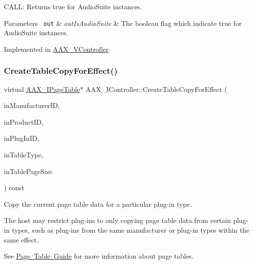 C\+A\+LL\+: Returns true for Audio\+Suite instances. 


\begin{DoxyParams}[1]{Parameters}
\mbox{\texttt{ out}}  & {\em out\+Is\+Audio\+Suite} & The boolean flag which indicate true for Audio\+Suite instances. \\
\hline
\end{DoxyParams}


Implemented in \mbox{\hyperlink{a01905_a3d3bd957f2b2f863333deadf5b8e6c6c}{A\+A\+X\+\_\+\+V\+Controller}}.

\mbox{\label{a01789_acd6c896d35ee2c36e8f6685f0c8592ad}} 
\subsubsection{\texorpdfstring{CreateTableCopyForEffect()}{CreateTableCopyForEffect()}}
{\footnotesize\ttfamily virtual \mbox{\hyperlink{a01849}{A\+A\+X\+\_\+\+I\+Page\+Table}}$\ast$ A\+A\+X\+\_\+\+I\+Controller\+::\+Create\+Table\+Copy\+For\+Effect (\begin{DoxyParamCaption}\item[{\mbox{\hyperlink{a00392_ab247c0d8686c14e05cbb567ef276f249}{A\+A\+X\+\_\+\+C\+Property\+Value}}}]{in\+Manufacturer\+ID,  }\item[{\mbox{\hyperlink{a00392_ab247c0d8686c14e05cbb567ef276f249}{A\+A\+X\+\_\+\+C\+Property\+Value}}}]{in\+Product\+ID,  }\item[{\mbox{\hyperlink{a00392_ab247c0d8686c14e05cbb567ef276f249}{A\+A\+X\+\_\+\+C\+Property\+Value}}}]{in\+Plug\+In\+ID,  }\item[{uint32\+\_\+t}]{in\+Table\+Type,  }\item[{int32\+\_\+t}]{in\+Table\+Page\+Size }\end{DoxyParamCaption}) const\hspace{0.3cm}{\ttfamily [pure virtual]}}



Copy the current page table data for a particular plug-\/in type. 

The host may restrict plug-\/ins to only copying page table data from certain plug-\/in types, such as plug-\/ins from the same manufacturer or plug-\/in types within the same effect.

See \mbox{\hyperlink{a00833}{Page Table Guide}} for more information about page tables.

